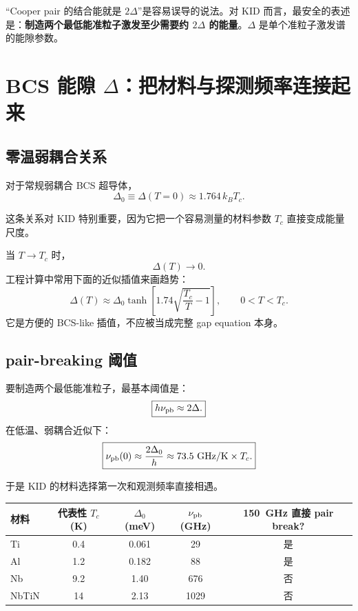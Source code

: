 \documentclass[11pt,a4paper,openany]{ctexrep}
\begin{document}
\begin{mistakebox}
“Cooper pair 的结合能就是 $2\Delta$”是容易误导的说法。对 KID 而言，最安全的表述是：\textbf{制造两个最低能准粒子激发至少需要约 $2\Delta$ 的能量}。$\Delta$ 是单个准粒子激发谱的能隙参数。
\end{mistakebox}

\section{BCS 能隙 $\Delta$：把材料与探测频率连接起来}

\subsection{零温弱耦合关系}
对于常规弱耦合 BCS 超导体，
\[
\boxed{\Delta_0\equiv\Delta(T=0)\approx1.764\,k_B T_c.}
\]

这条关系对 KID 特别重要，因为它把一个容易测量的材料参数 $T_c$ 直接变成能量尺度。

当 $T\rightarrow T_c$ 时，
\[
\Delta(T)\rightarrow0.
\]
工程计算中常用下面的近似插值来画趋势：
\[
\Delta(T)\approx
\Delta_0\tanh\!\left[
1.74\sqrt{\frac{T_c}{T}-1}
\right],\qquad 0<T<T_c.
\]
它是方便的 BCS-like 插值，不应被当成完整 gap equation 本身。

\subsection{pair-breaking 阈值}
要制造两个最低能准粒子，最基本阈值是：
\[
\boxed{h\nu_{\rm pb}\approx2\Delta.}
\]
在低温、弱耦合近似下：
\[
\boxed{
\nu_{\rm pb}(0)
\approx
\frac{2\Delta_0}{h}
\approx
73.5\ \mathrm{GHz/K}\times T_c.
}
\]

于是 KID 的材料选择第一次和观测频率直接相遇。

\begin{center}
\renewcommand{\arraystretch}{1.2}
\begin{tabular}{lcccc}
\toprule
材料 & 代表性 $T_c$ (K) & $\Delta_0$ (meV) & $\nu_{\rm pb}$ (GHz) & \SI{150}{GHz} 直接 pair break?\\
\midrule
Ti & 0.4 & 0.061 & 29 & 是 \\
Al & 1.2 & 0.182 & 88 & 是 \\
Nb & 9.2 & 1.40 & 676 & 否 \\
NbTiN & 14 & 2.13 & 1029 & 否 \\
\bottomrule
\end{tabular}
\end{center}
\end{document}

